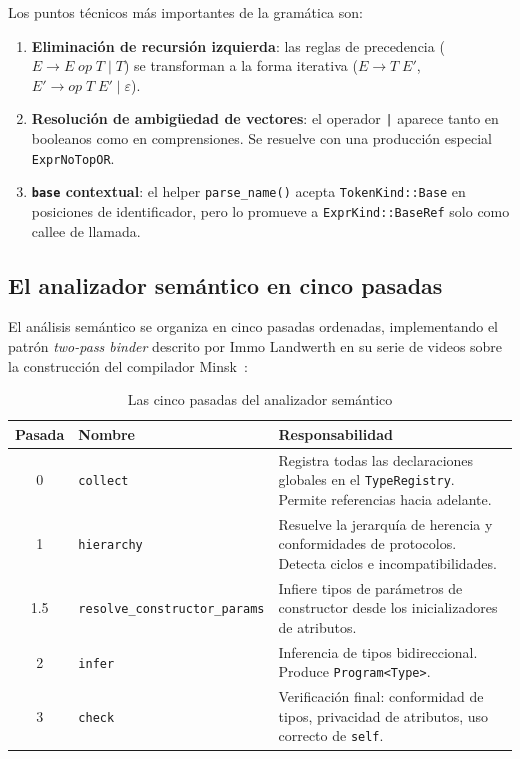 \documentclass[12pt, a4paper]{article}
\begin{document}
Los puntos t\'{e}cnicos m\'{a}s importantes de la gram\'{a}tica son:

\begin{enumerate}[leftmargin=*, label=\arabic*.]
    \item \textbf{Eliminaci\'{o}n de recursi\'{o}n izquierda}: las reglas de precedencia
          ($E \to E \; op \; T \mid T$) se transforman a la forma iterativa
          ($E \to T \; E'$, $E' \to op \; T \; E' \mid \varepsilon$).
    \item \textbf{Resoluci\'{o}n de ambig\"{u}edad de vectores}: el operador \texttt{|}
          aparece tanto en booleanos como en comprensiones. Se resuelve con una
          producci\'{o}n especial \texttt{ExprNoTopOR}.
    \item \textbf{\texttt{base} contextual}: el helper \texttt{parse\_name()}
          acepta \texttt{TokenKind::Base} en posiciones de identificador, pero
          lo promueve a \texttt{ExprKind::BaseRef} solo como callee de llamada.
\end{enumerate}

\subsection{El analizador sem\'{a}ntico en cinco pasadas}

El an\'{a}lisis sem\'{a}ntico se organiza en cinco pasadas ordenadas, implementando el
patr\'{o}n \textit{two-pass binder} descrito por Immo Landwerth en su serie de
videos sobre la construcci\'{o}n del compilador Minsk~\cite{landwerth2019}:

\begin{table}[h!]
\centering
\caption{Las cinco pasadas del analizador sem\'{a}ntico}
\label{tab:passes}
\begin{tabularx}{\textwidth}{@{}clX@{}}
\toprule
\textbf{Pasada} & \textbf{Nombre} & \textbf{Responsabilidad} \\
\midrule
0 & \texttt{collect} & Registra todas las declaraciones globales en el
                       \texttt{TypeRegistry}. Permite referencias hacia adelante. \\
1 & \texttt{hierarchy} & Resuelve la jerarqu\'{i}a de herencia y conformidades de
                         protocolos. Detecta ciclos e incompatibilidades. \\
1.5 & \texttt{resolve\_constructor\_params} & Infiere tipos de par\'{a}metros de
                         constructor desde los inicializadores de atributos. \\
2 & \texttt{infer} & Inferencia de tipos bidireccional. Produce
                     \texttt{Program<Type>}. \\
3 & \texttt{check} & Verificaci\'{o}n final: conformidad de tipos, privacidad de
                     atributos, uso correcto de \texttt{self}. \\
\bottomrule
\end{tabularx}
\end{table}
\end{document}
